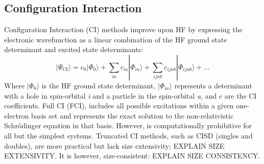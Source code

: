 \subsection{Configuration Interaction}
Configuration Interaction (CI) methods improve upon HF by expressing the electronic wavefunction as a linear combination of the HF ground state determinant and excited state determinants:
\begin{equation} \label{eq:CI}
     |\Psi_{\mathrm{CI}} \rangle = c_0 |\Phi_0 \rangle + \sum_{ia} c_{ia} |\Phi_{ia} \rangle + \sum_{ijab} c_{ijab} |\Phi_{ijab} \rangle + \dots
\end{equation}
Where $|\Phi_0 \rangle$ is the HF ground state determinant, $|\Phi_{ia} \rangle$ represents a determinant with a hole in spin-orbital \textit{i} and a particle in the spin-orbital \textit{a}, and c are the CI coefficients. Full CI (FCI),  includes all possible excitations within a given one-electron basis set and represents the exact solution to the non-relativistic Schrödinger equation in that basis. However, is computationally prohibitive for all but the simplest systems. Truncated CI methods, such as CISD (singles and doubles), are more practical but lack size extensivity; EXPLAIN SIZE EXTENSIVITY. It is however, size-consistent: EXPLAIN SIZE CONSISTENCY.

